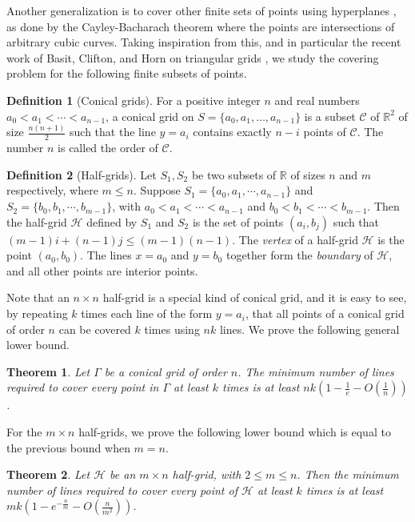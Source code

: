 \documentclass[usenames,dvipsnames, 11pt]{article}
\newtheorem{thm}{Theorem}
\numberwithin{thm}{section}
\theoremstyle{definition}
\newtheorem{mydef}{Definition}
\theoremstyle{definition}
\theoremstyle{definition}
\newcommand{\1}{\mathbf{1}}
\def\cH{{\mathcal H}}
\def\cC{{\mathcal{C}}}
\newcommand{\R}{\mathbb{R}}
\begin{document}
Another generalization is to cover other finite sets of points using hyperplanes \cite{BBSz10, basit2023covering}, as done by the Cayley-Bacharach theorem where the points are intersections of arbitrary cubic curves. 
Taking inspiration from this, and in particular the recent work of Basit, Clifton, and Horn on triangular grids \cite{basit2023covering}, we study the covering problem for the following finite subsets of points. 

\begin{mydef}[Conical grids]
    For a positive integer $n$ and real numbers $a_0 < a_1< \cdots < a_{n-1}$, a conical grid on $S = \{a_0, a_1, \dots, a_{n-1}\}$ is a subset $\cC$ of $\R^2$ of size $\frac{n(n+1)}{2}$ such that the line $y=a_i$ contains exactly $n-i$ points of $\cC$. The number $n$ is called the order of $\cC$.
\end{mydef}

\begin{mydef}[Half-grids]
    Let $S_1, S_2$ be two subsets of $\R$ of sizes $n$ and $m$ respectively, where $m \leq n$. Suppose $S_1=\{a_0, a_1, \cdots,  a_{n-1}\}$ and $S_2=\{b_0, b_1, \cdots, b_{m-1}\}$, with $a_0 < a_1 < \cdots < a_{n-1}$ and $b_0 < b_1 < \cdots < b_{m-1}$. 
    Then the half-grid $\mathcal{H}$ defined by $S_1$ and $S_2$ is the set of points $(a_i,b_j)$ such that $(m-1)i+(n-1)j \leq (m-1)(n-1)$. 
    The \textit{vertex} of a half-grid $\cH$ is the point $(a_0,b_0)$. The lines $x=a_0$ and $y=b_0$ together form the \textit{boundary} of $\cH$, and all other points are interior points.
\end{mydef}

Note that an $n \times n$ half-grid is a special kind of conical grid, and it is easy to see, by repeating $k$ times each line of the form $y=a_i$, that all points of a conical grid of order $n$ can be covered $k$ times using $nk$ lines. 
We prove the following general lower bound. 

\begin{thm}
\label{thm:conical_mult}
Let $\Gamma$ be a conical grid of order $n$. The minimum number of lines required to cover every point in $\Gamma$ at least $k$ times is at least $nk\left(1-\frac{1}{e}-O(\frac{1}{n}) \right)$.
\end{thm}

For the $m \times n$ half-grids, we prove the following lower bound which is equal to the previous bound when $m = n$. 

\begin{thm}
\label{thm:half_mult}
    Let $\cH$ be an $m \times n$ half-grid, with $2 \leq m \leq n$. Then the minimum number of lines required to cover every point of $\cH$ at least $k$ times is at least $mk\left(1-e^{-\frac{n}{m}}-O(\frac{n}{m^2})\right)$.
\end{thm}
\end{document}
